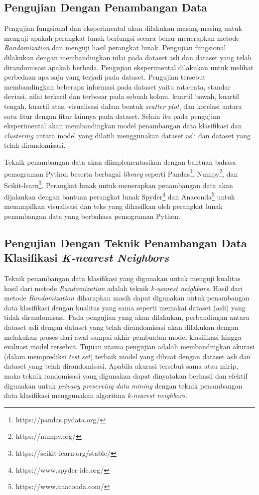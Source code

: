 \subsection{Pengujian Dengan Penambangan Data}
\label{subsec:analisis-penambangan}

Pengujian fungsional dan eksperimental akan dilakukan masing-masing untuk menguji apakah perangkat lunak berfungsi secara benar menerapkan metode \textit{Randomization} dan menguji hasil perangkat lunak. Pengujian fungsional dilakukan dengan membandingkan nilai pada dataset asli dan dataset yang telah dirandomisasi apakah berbeda. Pengujian eksperimental dilakukan untuk melihat perbedaan apa saja yang terjadi pada dataset. Pengujian tersebut membandingkan beberapa informasi pada dataset yaitu rata-rata, standar deviasi, nilai terkecil dan terbesar pada sebuah kolom, kuartil bawah, kuartil tengah, kuartil atas, visualisasi dalam bentuk \textit{scatter plot}, dan korelasi antara satu fitur dengan fitur lainnya pada dataset. Selain itu pada pengujian eksperimental akan membandingkan model penambangan data klasifikasi dan \textit{clustering} antara model yang dilatih menggunakan dataset asli dan dataset yang telah dirandomisasi.

Teknik penambangan data akan diimplementasikan dengan bantuan bahasa pemograman Python beserta berbagai \textit{library} seperti Pandas\footnote{https://pandas.pydata.org/}, Numpy\footnote{https://numpy.org/}, dan Scikit-learn\footnote{https://scikit-learn.org/stable/}. Perangkat lunak untuk menerapkan penambangan data akan dijalankan dengan bantuan perangkat lunak Spyder\footnote{https://www.spyder-ide.org/} dan Anaconda\footnote{https://www.anaconda.com/} untuk menampilkan visualisasi dan teks yang dihasilkan oleh perangkat lunak penambangan data yang berbahasa pemograman Python. 

\subsection{Pengujian Dengan Teknik Penambangan Data Klasifikasi \textit{K-nearest Neighbors}}
\label{subsec:analisis-knn}

Teknik penambangan data klasifikasi yang digunakan untuk menguji kualitas hasil dari metode \textit{Randomization} adalah teknik \textit{k-nearest neighbors}. Hasil dari metode \textit{Randomization} diharapkan masih dapat digunakan untuk penambangan data klasifikasi dengan kualitas yang sama seperti memakai dataset (asli) yang tidak dirandomisasi. Pada pengujian yang akan dilakukan, perbandingan antara dataset asli dengan dataset yang telah dirandomisasi akan dilakukan dengan melakukan proses dari awal sampai akhir pembuatan model klasifikasi hingga evaluasi model tersebut. Tujuan utama pengujian adalah membandingkan akurasi (dalam memprediksi \textit{test set}) terbaik model yang dibuat dengan dataset asli dan dataset yang telah dirandomisasi. Apabila akurasi tersebut sama atau mirip, maka teknik randomisasi yang digunakan dapat dinyatakan berhasil dan efektif digunakan untuk \textit{privacy preserving data mining} dengan teknik penambangan data klasifikasi menggunakan algoritma \textit{k-nearest neighbors}.

